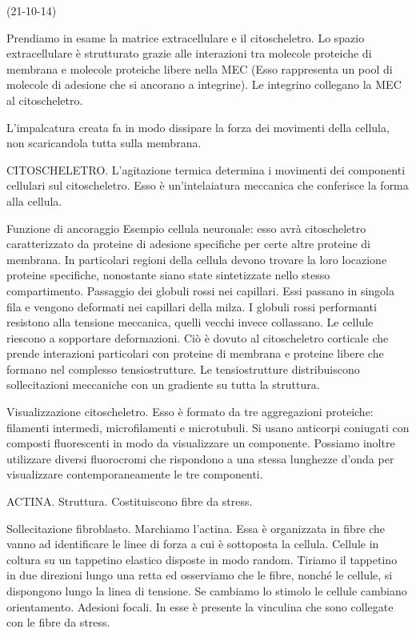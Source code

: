 \documentclass[a4paper,12pt]{article}
\begin{document}
(21-10-14)

Prendiamo in esame la matrice extracellulare e il citoscheletro.
Lo spazio extracellulare è strutturato grazie alle interazioni tra molecole proteiche di membrana e molecole proteiche libere nella MEC (Esso rappresenta un pool di molecole di adesione che si ancorano a integrine).
Le integrino collegano la MEC al citoscheletro.

L'impalcatura creata fa in modo dissipare la forza dei movimenti della cellula, non scaricandola tutta sulla membrana.

CITOSCHELETRO.
L'agitazione termica determina i movimenti dei componenti cellulari sul citoscheletro.
Esso è un'intelaiatura meccanica che conferisce la forma alla cellula.

Funzione di ancoraggio
Esempio cellula neuronale: esso avrà citoscheletro caratterizzato da proteine di adesione specifiche per certe altre proteine di membrana. In particolari regioni della cellula devono trovare la loro locazione proteine specifiche, nonostante siano state sintetizzate nello stesso compartimento.
Passaggio dei globuli rossi nei capillari. Essi passano in singola fila e vengono deformati nei capillari della milza. I globuli rossi performanti resistono alla tensione meccanica, quelli vecchi invece collassano.
Le cellule riescono a sopportare deformazioni. Ciò è dovuto al citoscheletro corticale che prende interazioni particolari con proteine di membrana e proteine libere che formano nel complesso tensiostrutture.
Le tensiostrutture distribuiscono sollecitazioni meccaniche con un gradiente su tutta la struttura.

Visualizzazione citoscheletro. Esso è formato da tre aggregazioni proteiche: filamenti intermedi, microfilamenti e microtubuli.
Si usano anticorpi coniugati con composti fluorescenti in modo da visualizzare un componente. Possiamo inoltre utilizzare diversi fluorocromi che rispondono a una stessa lunghezze d'onda per visualizzare contemporaneamente le tre componenti.

ACTINA. Struttura. Costituiscono fibre da stress. 


Sollecitazione fibroblasto. Marchiamo l'actina. Essa è organizzata in fibre che vanno ad identificare le linee di forza a cui è sottoposta la cellula.
Cellule in coltura su un tappetino elastico disposte in modo random. Tiriamo il tappetino in due direzioni lungo una retta ed osserviamo che le fibre, nonché le cellule, si dispongono lungo la linea di tensione. Se cambiamo lo stimolo le cellule cambiano orientamento.
Adesioni focali. In esse è presente la vinculina che sono collegate con le fibre da stress.
\end{document}
